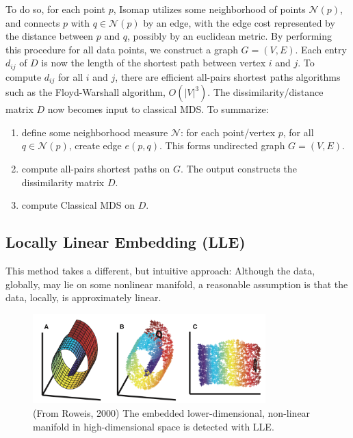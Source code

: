 \documentclass[11pt]{article}
\begin{document}
To do so, for each point $p$, Isomap utilizes some neighborhood of points $\mathcal{N}(p)$, and connects $p$ with $q \in \mathcal{N}(p)$ by an edge, with the edge cost represented by the distance between $p$ and $q$, possibly by an euclidean metric. By performing this procedure for all data points, we construct a graph $G = (V,E)$. Each entry $d_{ij}$ of $D$ is now the length of the shortest path between vertex $i$ and $j$. To compute $d_{ij}$ for all $i$ and $j$, there are efficient all-pairs shortest paths algorithms such as the Floyd-Warshall algorithm, $O(|V|^3)$. The dissimilarity/distance matrix $D$ now becomes input to classical MDS. To summarize:

\begin{enumerate}
\item define some neighborhood measure $\mathcal{N}$: for each point/vertex $p$, for all $q \in \mathcal{N}(p)$, create edge $e(p,q)$. This forms undirected graph $G = (V,E)$.
\item compute all-pairs shortest paths on $G$. The output constructs the dissimilarity matrix $D$.
\item compute Classical MDS on $D$.
\end{enumerate}

\subsection*{Locally Linear Embedding (LLE)}
This method takes a different, but intuitive approach: Although the data, globally, may lie on some nonlinear manifold, a reasonable assumption is that the data, locally, is approximately linear. \\

\begin{figure}[H]
\centering
\includegraphics[width=9cm]{lle.png}
\caption{(From Roweis, 2000) The embedded lower-dimensional, non-linear manifold in high-dimensional space is detected with LLE.}
\end{figure}
\end{document}
